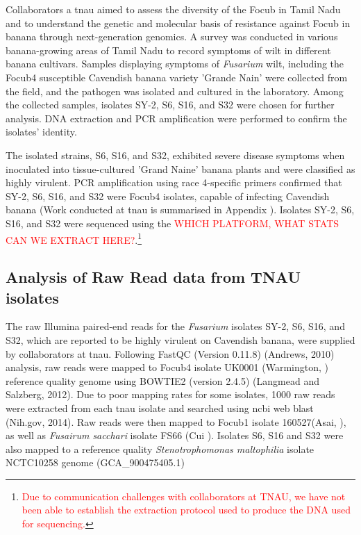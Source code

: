 Collaborators a \ac{tnau} aimed to assess the diversity of the \ac{Focub} in Tamil Nadu and to understand the genetic and molecular basis of resistance against \ac{Focub} in banana through next-generation genomics. A survey was conducted in various banana-growing areas of Tamil Nadu to record symptoms of wilt in different banana cultivars. Samples displaying symptoms of \textit{Fusarium} wilt, including the \ac{Focub4} susceptible Cavendish banana variety 'Grande Nain' were collected from the field, and the pathogen was isolated and cultured in the laboratory. Among the collected samples, isolates SY-2, S6, S16, and S32 were chosen for further analysis. DNA extraction and PCR amplification were performed to confirm the isolates' identity. 

The isolated strains, S6, S16, and S32, exhibited severe disease symptoms when inoculated into tissue-cultured 'Grand Naine' banana plants and were classified as highly virulent. PCR amplification using race 4-specific primers confirmed that SY-2, S6, S16, and S32 were \ac{Focub4} isolates, capable of infecting Cavendish banana (Work conducted at \ac{tnau} is summarised in Appendix ). Isolates SY-2, S6, S16, and S32 were sequenced using the \textcolor{red}{WHICH PLATFORM, WHAT STATS CAN WE EXTRACT HERE?}.\footnote{\textcolor{red}{Due to communication challenges with collaborators at TNAU, we have not been able to establish the extraction protocol used to produce the DNA used for sequencing.}}

\subsection{Analysis of Raw Read data from TNAU isolates}

The raw Illumina paired-end reads for the \textit{Fusarium} isolates SY-2, S6, S16, and S32, which are reported to be highly virulent on Cavendish banana, were supplied by collaborators at \ac{tnau}. Following FastQC (Version 0.11.8) (Andrews, 2010) analysis, raw reads were mapped to \ac{Focub4}  isolate UK0001 (Warmington, ) reference quality genome using BOWTIE2 (version 2.4.5) (Langmead and Salzberg, 2012). Due to poor mapping rates for some isolates, 1000 raw reads were extracted from each \ac{tnau} isolate and searched using \ac{ncbi} web \ac{blast} (Nih.gov, 2014). 
Raw reads were then mapped to \ac{Focub1} isolate 160527(Asai, ), as well as \textit{Fusairum sacchari} isolate FS66 (Cui ). Isolates S6, S16 and S32 were also mapped to a reference quality \textit{Stenotrophomonas maltophilia} isolate NCTC10258 genome (GCA\_900475405.1) 

